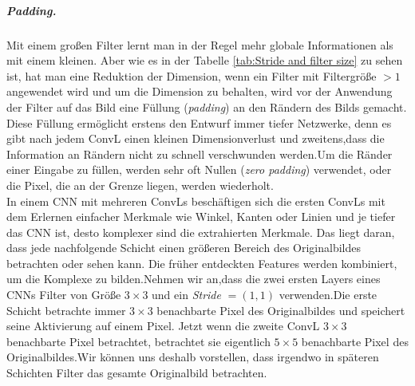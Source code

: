 \documentclass[12pt,a4paper]{scrartcl}
\numberwithin{equation}{section}
\begin{document}
\subparagraph{\textit{Padding}.}
	Mit einem großen Filter lernt man in der Regel  mehr globale Informationen als mit einem kleinen. Aber wie es in der Tabelle \ref{tab:Stride and filter size} zu sehen ist, hat man eine Reduktion der Dimension, wenn ein Filter mit Filtergröße $ >1 $ angewendet wird und um die Dimension zu behalten, wird vor der Anwendung der Filter auf das Bild eine Füllung (\textit{padding}) an den Rändern des Bilds gemacht. Diese Füllung ermöglicht erstens den Entwurf immer tiefer Netzwerke, denn es gibt nach jedem \ac{ConvL} einen kleinen Dimensionverlust und zweitens,dass die Information an Rändern nicht zu schnell verschwunden werden.Um die Ränder einer Eingabe zu füllen, werden sehr oft Nullen (\textit{zero padding}) verwendet, oder die Pixel, die an der Grenze liegen, werden wiederholt.\\

In einem \ac{CNN} mit mehreren \acsp{ConvL} beschäftigen sich die ersten \acsp{ConvL} mit dem Erlernen einfacher Merkmale wie Winkel, Kanten oder Linien und je tiefer das \ac{CNN} ist, desto komplexer sind die extrahierten Merkmale. Das liegt daran, dass jede nachfolgende Schicht einen \glqq größeren\grqq{} Bereich des Originalbildes betrachten oder \glqq sehen \grqq{} kann. Die früher entdeckten Features werden kombiniert, um die Komplexe zu bilden.Nehmen wir an,dass die zwei ersten Layers eines \acsp{CNN} Filter von Größe $ 3\times 3 $  und ein \textit{Stride} $ =(1,1) $ verwenden.Die erste Schicht betrachte immer $ 3\times3 $ benachbarte Pixel des Originalbildes und speichert seine Aktivierung auf einem Pixel. Jetzt wenn die zweite \ac{ConvL}  $ 3\times3 $ benachbarte Pixel betrachtet, betrachtet sie eigentlich  $ 5\times5 $ benachbarte Pixel des Originalbildes.Wir können uns deshalb vorstellen, dass irgendwo in späteren Schichten Filter das gesamte Originalbild betrachten.
\end{document}
